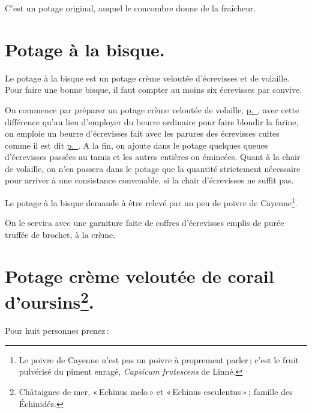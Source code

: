 C'est un potage original, auquel le concombre donne de la fraîcheur.

\section*{\centering Potage à la bisque.}

Le potage à la bisque est un potage crème veloutée d'écrevisses et de volaille.
Pour faire une bonne bisque, il faut compter au moins six écrevisses par
convive.

On commence par préparer un potage crème veloutée de volaille,
\hyperlink{p0239}{p. \pageref{pg0239}}, avec cette différence qu'au lieu
d'employer du beurre ordinaire pour faire blondir la farine, on emploie un
beurre d'écrevisses fait avec les parures des écrevisses cuites comme il est
dit \hyperlink{p0287}{p. \pageref{pg0287}}. A la fin, on ajoute dans le potage
quelques queues d'écrevisses passées au tamis et les autres entières ou
émincées. Quant à la chair de volaille, on n'en passera dans le potage que la
quantité strictement nécessaire pour arriver à une consistance convenable, si
la chair d’écrevisses ne suffit pas.

Le potage à la bisque demande à être relevé par un peu de poivre de
Cayenne\footnote{Le poivre de Cayenne n'est pas un poivre à proprement parler ;
c'est le fruit pulvérisé du piment enragé, \textit{Capsicum frutescens} de
Linné.}.

On le servira avec une garniture faite de coffres d'écrevisses emplis de purée
truffée de brochet, à la crème.

\section*{\centering Potage crème veloutée de corail d'oursins\footnote{Châtaignes de mer, 
                                                                      « Echinus melo » et 
                                                                      « Echinus esculentus » ; 
                                                                      famille des Échinidés.}.}

Pour huit personnes prenez :

\medskip


